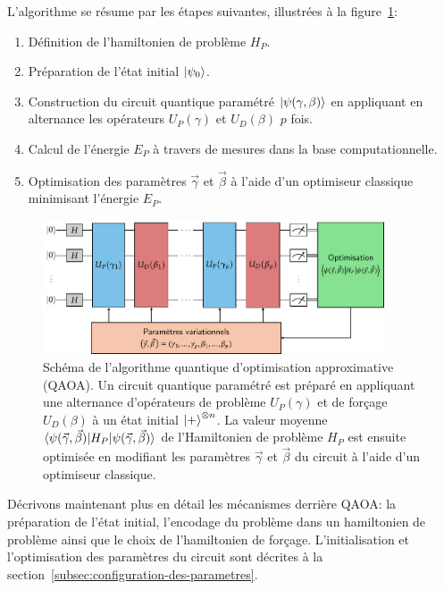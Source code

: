 L'algorithme se résume par les étapes suivantes, illustrées à la figure~\ref{fig:qaoa}:

\begin{enumerate}[(1)]
    \item Définition de l'hamiltonien de problème $H_{P}$.
    \item Préparation de l'état initial $\ket{\psi_{0}}$.
    \item Construction du circuit quantique paramétré $\ket{\psi(\gamma, \beta)}$ en appliquant en alternance les opérateurs $U_{P}(\gamma)$ et $U_{D}(\beta)$ $p$ fois.
    \item Calcul de l'énergie $E_{P}$ à travers de mesures dans la base computationnelle.
    \item Optimisation des paramètres $\vec{\gamma}$ et $\vec{\beta}$ à l'aide d'un optimiseur classique minimisant l'énergie $E_{P}$.
\end{enumerate}

\begin{figure}[h]
    \centering
    \includegraphics[width=0.9\textwidth]{figures/qaoa.pdf}
    \caption[Algorithme quantique d'optimisation approximative]{Schéma de l'algorithme quantique d'optimisation approximative (QAOA). Un circuit quantique paramétré est préparé en appliquant une alternance d'opérateurs de problème $U_{P}(\gamma)$ et de forçage $U_{D}(\beta)$ à un état initial $\ket{+}^{\otimes n}$. La valeur moyenne $\braket{ \psi(\vec{\gamma}, \vec{\beta}) | H_{P} | \psi(\vec{\gamma}, \vec{\beta}) }$ de l'Hamiltonien de problème $H_{P}$ est ensuite optimisée en modifiant les paramètres $\vec{\gamma}$ et $\vec{\beta}$ du circuit à l'aide d'un optimiseur classique.}
    \label{fig:qaoa}
\end{figure}

Décrivons maintenant plus en détail les mécanismes derrière QAOA: la préparation de l'état initial, l'encodage du problème dans un hamiltonien de problème ainsi que le choix de l'hamiltonien de forçage. L'initialisation et l'optimisation des paramètres du circuit sont décrites à la section~\ref{subsec:configuration-des-parametres}.

